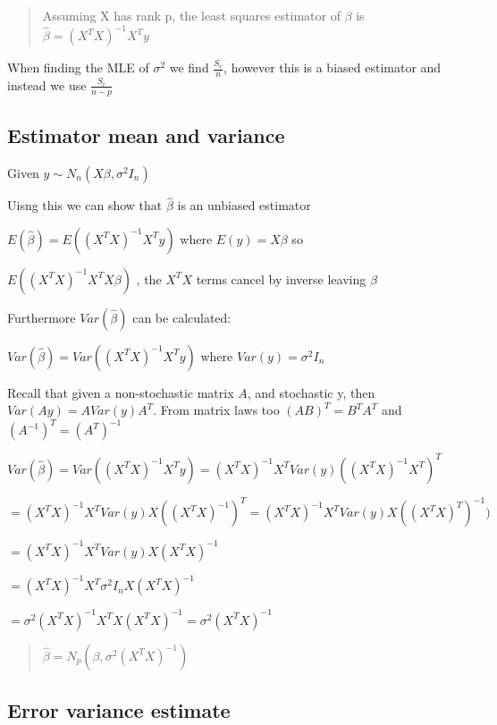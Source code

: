 \documentclass[
  letterpaper,
  DIV=11,
  numbers=noendperiod]{scrreprt}
\begin{document}
\begin{quote}
Assuming X has rank p, the least squares estimator of \(\beta\) is
\(\hat{\beta} = (X^TX)^{-1}X^Ty\)
\end{quote}

When finding the MLE of \(\sigma^2\) we find \(\frac{S_r}{n}\), however
this is a biased estimator and instead we use \(\frac{S_r}{n-p}\)

\hypertarget{estimator-mean-and-variance}{%
\subsection{Estimator mean and
variance}\label{estimator-mean-and-variance}}

Given \(y \sim N_n(X\beta, \sigma^2I_n)\)

Uisng this we can show that \(\hat{\beta}\) is an unbiased estimator

\(E(\hat{\beta}) = E((X^TX)^{-1}X^Ty)\) where \(E(y) = X\beta\) so

\(E((X^TX)^{-1}X^TX\beta)\) , the \(X^TX\) terms cancel by inverse
leaving \(\beta\)

Furthermore \(Var(\hat{\beta})\) can be calculated:

\(Var(\hat{\beta}) = Var((X^TX)^{-1}X^Ty)\) where
\(Var(y) = \sigma^2I_n\)

Recall that given a non-stochastic matrix \(A\), and stochastic y, then
\(Var(Ay) = A Var(y) A^T\). From matrix laws too \((AB)^T = B^TA^T\) and
\((A^{-1})^T = (A^T)^{-1}\)

\(Var(\hat{\beta}) = Var((X^TX)^{-1}X^Ty) = (X^TX)^{-1}X^T Var(y)((X^TX)^{-1}X^T)^T\)

\(= (X^TX)^{-1}X^T Var(y) X((X^TX)^{-1})^T = (X^TX)^{-1}X^T Var(y) X((X^TX)^T)^{-1})\)

\(= (X^TX)^{-1}X^T Var(y) X(X^TX)^{-1}\)

\(= (X^TX)^{-1}X^T \sigma^2 I_n X(X^TX)^{-1}\)

\(= \sigma^2 (X^TX)^{-1}X^TX(X^TX)^{-1} = \sigma^2 (X^TX)^{-1}\)

\begin{quote}
\(\hat{\beta} = N_p(\beta, \sigma^2 (X^TX)^{-1})\)
\end{quote}

\hypertarget{error-variance-estimate}{%
\subsection{Error variance estimate}\label{error-variance-estimate}}
\end{document}
